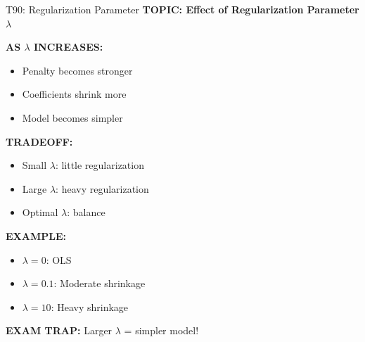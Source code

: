\documentclass[8pt]{beamer}
\begin{document}
	\begin{frame}{T90: Regularization Parameter}
		\fontsize{6.5}{7.5}\selectfont
		\textbf{TOPIC: Effect of Regularization Parameter $\lambda$}
		
		\vspace{0.1cm}
		\textbf{AS $\lambda$ INCREASES:}
		\begin{itemize}
			\item Penalty becomes stronger
			\item Coefficients shrink more
			\item Model becomes simpler
		\end{itemize}
		
		\vspace{0.1cm}
		\textbf{TRADEOFF:}
		\begin{itemize}
			\item Small $\lambda$: little regularization
			\item Large $\lambda$: heavy regularization
			\item Optimal $\lambda$: balance
		\end{itemize}
		
		\vspace{0.1cm}
		\textbf{EXAMPLE:}
		\begin{itemize}
			\item $\lambda = 0$: OLS
			\item $\lambda = 0.1$: Moderate shrinkage
			\item $\lambda = 10$: Heavy shrinkage
		\end{itemize}
		
		\textcolor{myred}{\textbf{EXAM TRAP:}} Larger $\lambda$ = \textcolor{myblue}{simpler model}!
	\end{frame}
	
\end{document}
